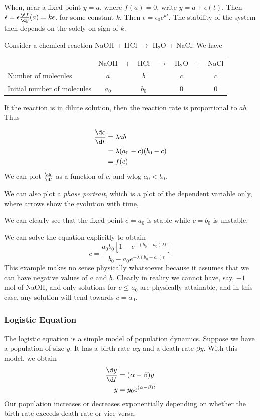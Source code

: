 \documentclass[a4paper]{article}
\begin{document}
When, near a fixed point $y = a$, where $f(a) = 0$, write $y = a + \epsilon(t)$. Then $\dot \epsilon = \epsilon\frac{\d f}{\d y}(a) = k\epsilon$. for some constant $k$. Then $\epsilon = \epsilon_0 e^{kt}$. The stability of the system then depends on the solely on sign of $k$.

\begin{eg}
  Consider a chemical reaction NaOH + HCl $\rightarrow$ H$_2$O + NaCl. We have\vspace{4pt} \\
\begin{tabular}{lccccccc}
                            & NaOH  & + & HCl   & $\rightarrow$ & H$_2$O & + & NaCl \\
Number of molecules         & $a$   &   & $b$   &               & $c$    &   & $c$  \\
Initial number of molecules & $a_0$ &   & $b_0$ &               & $0$    &   & $0$
\end{tabular}
\vspace{4pt}

If the reaction is in dilute solution, then the reaction rate is proportional to $ab$. Thus

\begin{align*}
  \frac{\d c}{\d t} &= \lambda ab\\
  &= \lambda (a_0 - c)(b_0 - c)\\
  &= f(c)
\end{align*}
We can plot $\frac{\d c}{\d t}$ as a function of $c$, and wlog $a_0 < b_0$.

\newpage %
We can also plot a \emph{phase portrait}, which is a plot of the dependent variable only, where arrows show the evolution with time,


We can clearly see that the fixed point $c = a_0$ is stable while $c = b_0$ is unstable.

\note We can solve the equation explicitly to obtain 
\[
c = \frac{a_0b_0[1 - e^{-(b_0 - a_0)\lambda t}]}{b_0 - a_0e^{-\lambda(b_0-a_0)t}}
\]
\note This example makes no sense physically whatsoever because it assumes that we can have negative values of $a$ and $b$. Clearly in reality we cannot have, say, $-1$ mol of NaOH, and only solutions for $c \leq a_0$ are physically attainable, and in this case, any solution will tend towards $c = a_0$.
\end{eg}

\subsubsection{Logistic Equation}
The logistic equation is a simple model of population dynamics. Suppose we have a population of size $y$. It has a birth rate $\alpha y$ and a death rate $\beta y$. With this model, we obtain
\begin{align*}
  \frac{\d y}{\d t} &= (\alpha - \beta)y\\
  y &= y_0 e^{(\alpha - \beta)t}
\end{align*}
Our population increases or decreases exponentially depending on whether the birth rate exceeds death rate or vice versa.
\end{document}
